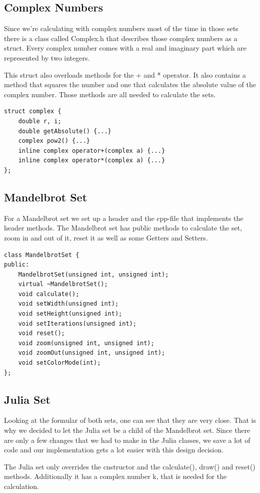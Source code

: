 \documentclass[final, paper=a4, paper=portrait, pagesize=auto, fontsize=10pt,english]{scrartcl}
\begin{document}
\subsection{Complex Numbers}
Since we're calculating with complex numbers most of the time in those sets there is a class called Complex.h that describes those complex numbers as a struct. Every complex number comes with a real and imaginary part which are represented by two integers.

This struct also overloads methods for the + and * operator. It also contains a method that squares the number and one that calculates the absolute value of the complex number. Those methods are all needed to calculate the sets.

\begin{lstlisting}
struct complex {
	double r, i;
	double getAbsolute() {...}
	complex pow2() {...}
	inline complex operator+(complex a) {...}
	inline complex operator*(complex a) {...}
};
\end{lstlisting} 

\subsection{Mandelbrot Set}
For a Mandelbrot set we set up a header and the cpp-file that implements the header methods. 
The Mandelbrot set has public methods to calculate the set, zoom in and out of it, reset it as well as some Getters and Setters. 

\begin{lstlisting}
class MandelbrotSet {
public:
	MandelbrotSet(unsigned int, unsigned int);
	virtual ~MandelbrotSet();
	void calculate();
	void setWidth(unsigned int);
	void setHeight(unsigned int);
	void setIterations(unsigned int);
	void reset();
	void zoom(unsigned int, unsigned int);
	void zoomOut(unsigned int, unsigned int);
	void setColorMode(int);
};
\end{lstlisting}

\subsection{Julia Set}
Looking at the formular of both sets, one can see that they are very close. That is why we decided to let the Julia set be a child of the Mandelbrot set. Since there are only a few changes that we had to make in the Julia classes, we save a lot of code and our implementation gets a lot easier with this design decision. 

The Julia set only overrides the cnstructor and the calculate(), draw() and reset() methods. Additionally it has a complex number k, that is needed for the calculation.
\end{document}
